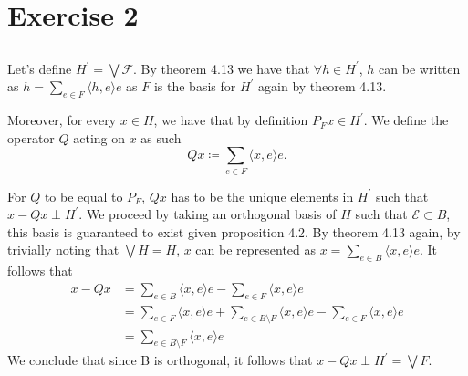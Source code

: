 \documentclass[a4paper,12pt]{article} %
\begin{document}
\section{Exercise 2}
\subsection{}
Let's define \(H^{\prime}  = \bigvee \mathcal{F}\). By theorem 4.13 we have that \(\forall h \in  H^{\prime} \), \(h\) can be written as \(h = \sum_{e \in  F} \langle h,e \rangle e  \) as \(F\) is the basis for \(H^{\prime} \) again by theorem 4.13.

Moreover, for every \(x \in H\), we have that by definition \(P_F x \in  H^{\prime} \).
We define the operator \(Q\) acting on \(x\) as such
\begin{equation}
    Qx \coloneqq \sum_{e \in  F}\langle x,e \rangle e.
\end{equation}

For \(Q\) to be equal to \(P_F\), \(Qx \) has to be the unique elements in \(H^{\prime} \) such that \(x - Qx \perp H^{\prime} \).
We proceed by taking an orthogonal basis of \(H\) such that \(\mathcal{E} \subset B\), this basis is guaranteed to exist given proposition 4.2.
By theorem 4.13 again, by trivially noting that \(\bigvee H = H\), \(x\) can be represented as \(x=\sum_{e\in B}\langle x,e \rangle e  \).
It follows that
\begin{align*}
    x-Qx & = \sum_{e \in  B}\langle x,e \rangle e - \sum_{e \in  F}\langle x,e \rangle e                                                   \\
         & =  \sum_{e \in F}\langle x,e \rangle e+ \sum_{e \in  B\setminus F}\langle x,e \rangle e  - \sum_{e \in  F}\langle x,e \rangle e \\
         & = \sum_{e \in  B\setminus F}\langle x,e \rangle e
\end{align*}
We conclude that since B is orthogonal, it follows that \(x-Qx \perp H^{\prime} = \bigvee F\).
\end{document}
